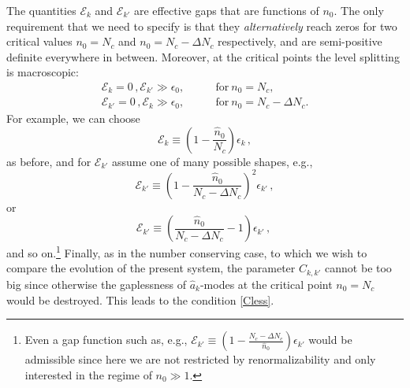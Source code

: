 \documentclass[aps,prd,reprint,superscriptaddress,nofootinbib]{revtex4-2}
\begin{document}
	The quantities ${\mathcal E}_k$ and ${\mathcal E}_{k'}$ are 
	effective gaps that are functions of $n_0$.  The only requirement that we need to specify is that they {\it alternatively} reach zeros
	for two critical values $n_0= N_c$ and $n_0=N_c - \Delta N_c$ respectively,  
	and are semi-positive definite everywhere in between.
	Moreover, at the critical points the level splitting is macroscopic:   
	\begin{align} \label{Cpoints}
	\nonumber
	{\mathcal E}_k = 0\,, {\mathcal E}_{k'} \gg \epsilon_0,     & \qquad\text{for} ~ n_0=N_c, 
	\\	
	{\mathcal E}_{k'} = 0\,, {\mathcal E}_{k} \gg \epsilon_0,       &\qquad \text{for} ~
	n_0=N_c-\Delta N_c.
	\end{align}
	For example, we can choose
	\begin{equation} 
	{\mathcal E}_k \equiv \left(1-\frac{\hat{n}_0}{N_c}\right)\epsilon_k\,, 
	\end{equation}
	as before, and for ${\mathcal E}_{k'}$ assume one of many possible shapes, e.g.,  
	\begin{equation} 
	{\mathcal E}_{k'} \equiv  \left(1-\frac{\hat{n}_0}{N_c-\Delta N_c}\right)^2\epsilon_{k'} \, ,
	\end{equation}
	or
	\begin{equation} 
	{\mathcal E}_{k'} \equiv \left(\frac{\hat{n}_0}{N_c-\Delta N_c}-1\right)\epsilon_{k'}\,,~ 
	\end{equation}
	and so on.\footnote{Even a gap function such as, e.g., ${\mathcal E}_{k'} \equiv  \left(1-\frac{N_c-\Delta N_c}{\hat{n}_0}\right)\epsilon_{k'}$ would be admissible since here we are not restricted by renormalizability and only interested in the regime of $n_0 \gg 1$.}
	 Finally, as in the number conserving case, to which we wish to compare the evolution of the present system, the parameter $C_{k,k'}$ cannot be too big since otherwise the gaplessness
		of $\hat{a}_k$-modes at the critical point $n_0=N_c$ would be destroyed. This leads to the condition \eqref{Cless}.

	
	
\end{document}
